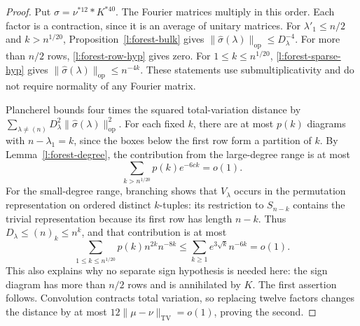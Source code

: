 \begin{proof}
Put $\sigma=\nu^{*12}*K^{*40}$.  The Fourier matrices multiply in
this order.  Each factor is a contraction, since it is an average of
unitary matrices.  For $\lambda'_1\le n/2$ and
$k>n^{1/20}$, Proposition~\ref{l:forest-bulk} gives
$\|\widehat\sigma(\lambda)\|_{\mathrm{op}}\le D_\lambda^{-4}$.
For more than $n/2$ rows, \eqref{l:forest-row-hyp} gives zero.
For $1\le k\le n^{1/20}$, \eqref{l:forest-sparse-hyp} gives
$\|\widehat\sigma(\lambda)\|_{\mathrm{op}}\le n^{-4k}$.
These statements use submultiplicativity and do not require normality
of any Fourier matrix.

Plancherel bounds four times the squared total-variation distance by
$\sum_{\lambda\ne(n)}D_\lambda^2
\|\widehat\sigma(\lambda)\|_{\mathrm{op}}^2$.
For each fixed $k$, there are at most $p(k)$ diagrams with
$n-\lambda_1=k$, since the boxes below the first row form a
partition of $k$.  By Lemma~\ref{l:forest-degree}, the contribution
from the large-degree range is at most
\[
 \sum_{k>n^{1/20}}p(k)e^{-6ck}=o(1).
\]
For the small-degree range, branching shows that $V_\lambda$ occurs
in the permutation representation on ordered distinct $k$-tuples:
its restriction to $S_{n-k}$ contains the trivial representation
because its first row has length $n-k$.
Thus $D_\lambda\le(n)_k\le n^k$, and that contribution is at most
\[
 \sum_{1\le k\le n^{1/20}}p(k)n^{2k}n^{-8k}
 \le\sum_{k\ge1}e^{3\sqrt k}n^{-6k}=o(1).
\]
This also explains why no separate sign hypothesis is needed here:
the sign diagram has more than $n/2$ rows and is annihilated by $K$.
The first assertion follows.  Convolution contracts total variation,
so replacing twelve factors changes the distance by at most
$12\|\mu-\nu\|_{\mathrm{TV}}=o(1)$, proving the second.
\end{proof}
